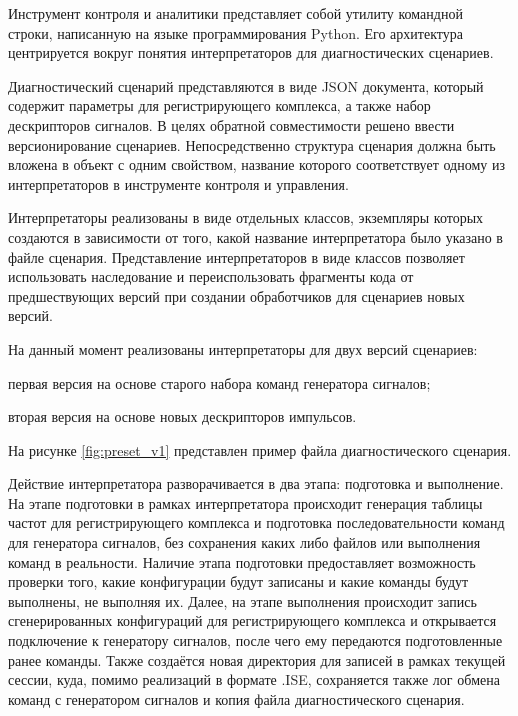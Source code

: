 \documentclass{report}
\begin{document}
Инструмент контроля и аналитики представляет собой утилиту командной строки, написанную на языке программирования Python. Его архитектура центрируется вокруг понятия интерпретаторов для диагностических сценариев.

Диагностический сценарий представляются в виде JSON документа, который содержит параметры для регистрирующего комплекса, а также набор дескрипторов сигналов. В целях обратной совместимости решено ввести версионирование сценариев. Непосредственно структура сценария должна быть вложена в объект с одним свойством, название которого соответствует одному из интерпретаторов в инструменте контроля и управления.

Интерпретаторы реализованы в виде отдельных классов, экземпляры которых создаются в зависимости от того, какой название интерпретатора было указано в файле сценария. Представление интерпретаторов в виде классов позволяет использовать наследование и переиспользовать фрагменты кода от предшествующих версий при создании обработчиков для сценариев новых версий.

На данный момент реализованы интерпретаторы для двух версий сценариев:

\begin{enummarker}
    \item первая версия на основе старого набора команд генератора сигналов;
    \item вторая версия на основе новых дескрипторов импульсов.
\end{enummarker}

На рисунке \ref{fig:preset_v1} представлен пример файла диагностического сценария.


Действие интерпретатора разворачивается в два этапа: подготовка и выполнение. На этапе подготовки в рамках интерпретатора происходит генерация таблицы частот для регистрирующего комплекса и подготовка последовательности команд для генератора сигналов, без сохранения каких либо файлов или выполнения команд в реальности. Наличие этапа подготовки предоставляет возможность проверки того, какие конфигурации будут записаны и какие команды будут выполнены, не выполняя их. Далее, на этапе выполнения происходит запись сгенерированных конфигураций для регистрирующего комплекса и открывается подключение к генератору сигналов, после чего ему передаются подготовленные ранее команды. Также создаётся новая директория для записей в рамках текущей сессии, куда, помимо реализаций в формате .ISE, сохраняется также лог обмена команд с генератором сигналов и копия файла диагностического сценария.
\end{document}
